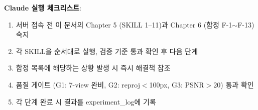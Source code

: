 \documentclass[11pt, a4paper]{report}
\begin{document}
\begin{summary}
\textbf{Claude 실행 체크리스트}:
\begin{enumerate}
\item 서버 접속 전 이 문서의 Chapter 5 (SKILL 1--11)과 Chapter 6 (함정 F-1$\sim$F-13) 숙지
\item 각 SKILL을 순서대로 실행, 검증 기준 통과 확인 후 다음 단계
\item 함정 목록에 해당하는 상황 발생 시 즉시 해결책 참조
\item 품질 게이트 (G1: 7-view 완비, G2: reproj$<$100px, G3: PSNR$>$20) 통과 확인
\item 각 단계 완료 시 결과를 experiment\_log에 기록
\end{enumerate}
\end{summary}
\end{document}
